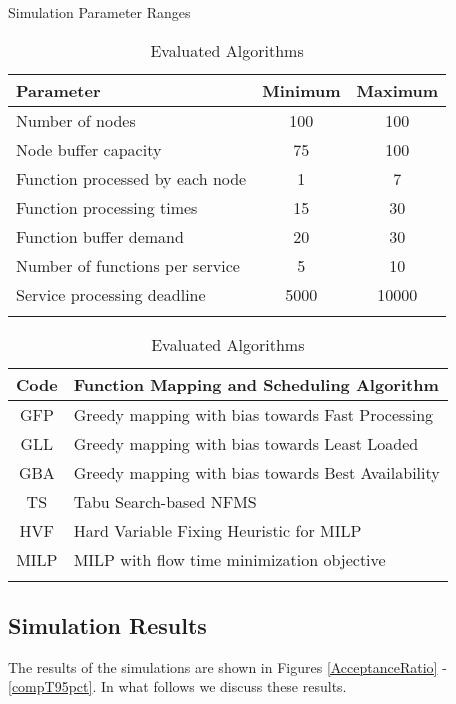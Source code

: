 \documentclass[conference]{IEEEtran}
\begin{document}
\begin{table}[t]   
\begin{minipage}{.99\linewidth}
\centering
\renewcommand{\arraystretch}{1.4}
\caption{\scriptsize Simulation Parameter Ranges}
\begin{tabular}{l c c}
\hline
\bfseries Parameter & \bfseries Minimum & \bfseries Maximum\\
\hline\hline
Number of nodes & 100 & 100\\
Node buffer capacity & 75 & 100\\
Function processed by each node & 1 & 7\\
Function processing times & 15 & 30\\
Function buffer demand & 20 & 30\\
Number of functions per service & 5 & 10\\
Service processing deadline & 5000 & 10000\\
\hline
\label{simulationP}
\end{tabular}
\end{minipage} 
\begin{minipage}{.99\linewidth}
\caption{\scriptsize Evaluated Algorithms}
\centering
\renewcommand{\arraystretch}{1.6}
\begin{tabular}{c l}
\hline
\bfseries Code & \bfseries Function Mapping and Scheduling Algorithm\\
\hline\hline
GFP  & Greedy mapping with bias towards Fast Processing\\
GLL & Greedy mapping with bias towards Least Loaded\\
GBA & Greedy mapping with bias towards Best Availability\\
TS & Tabu Search-based NFMS\\
HVF & Hard Variable Fixing Heuristic for MILP\\
MILP & MILP with flow time minimization objective\\
\hline
\label{table1}
\end{tabular}
\end{minipage}       
\end{table}







\subsection{Simulation Results}
The results of the simulations are shown in Figures \ref{AcceptanceRatio} - \ref{compT95pct}. In what follows we discuss these results.
\end{document}
